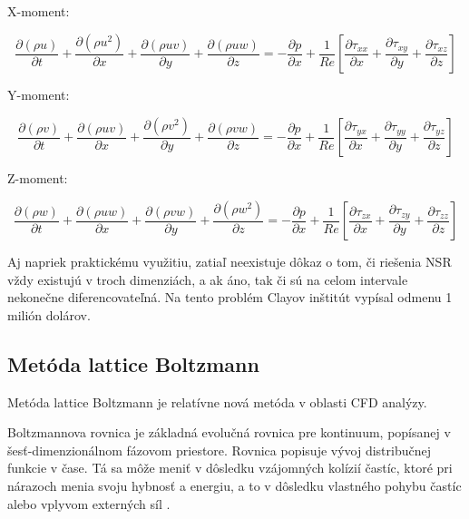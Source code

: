 \documentclass[]{tukediphc}
\begin{document}
X-moment:

\begin{equation}
\frac{\partial (\rho u)}{\partial t} + \frac{\partial (\rho u^2)}{\partial x} + \frac{\partial (\rho uv)}{\partial y} + \frac{\partial (\rho uw)}{\partial z} = - \frac{\partial p}{\partial x} + \frac{1}{Re} \left[\frac{\partial \tau_{xx}}{\partial x} + \frac{\partial \tau_{xy}}{\partial y} + \frac{\partial \tau_{xz}}{\partial z}\right]
\end{equation}

Y-moment:

\begin{equation}
\frac{\partial  (\rho v)}{\partial t} + \frac{\partial (\rho uv)}{\partial x} + \frac{\partial (\rho v^2)}{\partial y} + \frac{\partial (\rho vw)}{\partial z} = - \frac{\partial p}{\partial x} + \frac{1}{Re} \left[\frac{\partial \tau_{yx}}{\partial x} + \frac{\partial \tau_{yy}}{\partial y} + \frac{\partial \tau_{yz}}{\partial z}\right]
\end{equation}

Z-moment:

\begin{equation}
\frac{\partial  (\rho w)}{\partial t} + \frac{\partial (\rho uw)}{\partial x} + \frac{\partial (\rho vw)}{\partial y} + \frac{\partial (\rho w^2)}{\partial z} = - \frac{\partial p}{\partial x} + \frac{1}{Re} \left[\frac{\partial \tau_{zx}}{\partial x} + \frac{\partial \tau_{zy}}{\partial y} + \frac{\partial \tau_{zz}}{\partial z}\right]
\end{equation}



Aj napriek praktickému využitiu, zatiaľ neexistuje dôkaz o tom, či riešenia NSR vždy existujú v troch dimenziách, a ak áno, tak či sú na celom intervale nekonečne diferencovateľná. Na tento problém Clayov inštitút vypísal odmenu 1 milión dolárov.

\subsection{Metóda lattice Boltzmann}

Metóda lattice Boltzmann je relatívne nová metóda v oblasti CFD analýzy.


\citep{delbosc2015}


Boltzmannova rovnica je základná evolučná rovnica pre kontinuum, popísanej v šesť-dimenzionálnom fázovom priestore. Rovnica popisuje vývoj distribučnej funkcie v čase. Tá sa môže meniť v dôsledku vzájomných kolízií častíc, ktoré pri nárazoch menia svoju hybnosť a energiu, a to v dôsledku vlastného pohybu častíc alebo vplyvom externých síl \citep{HEIDLER2011thesis}.
\end{document}
